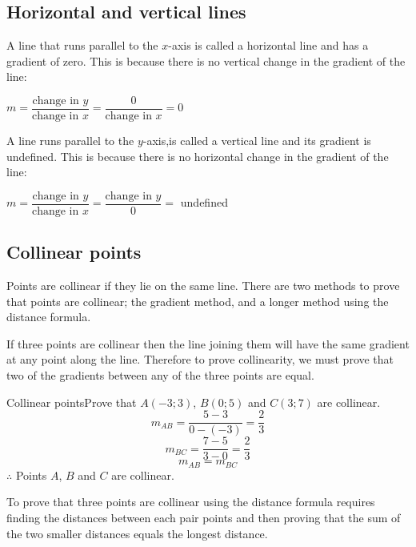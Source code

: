\subsection*{Horizontal and vertical lines}

A line that runs parallel to the $x$-axis is called a horizontal line and has a gradient of zero. This is
because there is no vertical change in the gradient of the line:\par
$m = \dfrac{\mbox{change in }y}{\mbox{change in }x} = \dfrac{0}{\mbox{change in }x} =0$\par

A line runs parallel to the $y$-axis,is called a vertical line and its gradient is undefined. This is because there is no horizontal change in the gradient of the line:\par
$m = \dfrac{\mbox{change in }y}{\mbox{change in }x} = \dfrac{\mbox{change in }y}{0}=$ undefined\par

\subsection*{Collinear points}

Points are collinear if they lie on the same line. There are two methods to prove that points are collinear; the gradient method, and a
longer method using the distance formula.

If three points are collinear then the line joining them will have the same gradient at any point along the line.
Therefore to prove collinearity, we must prove that two of the gradients between any of the three points are
equal.

\begin{wex}{Collinear points}{Prove that $A(-3;3)$, $B(0;5)$ and $C(3;7)$ are collinear.}{
\begin{equation*}
m_{AB} = \frac{5-3}{0-(-3)} = \frac{2}{3}
\end{equation*}
\begin{equation*}
m_{BC} = \frac{7-5}{3-0} = \frac{2}{3}
\end{equation*}
\begin{equation*}
m_{AB} = m_{BC}
\end{equation*}
$\therefore$ Points $A$, $B$ and $C$ are collinear.
}
\end{wex}

To prove that three points are collinear using the distance formula requires finding the
distances between each pair points and then proving that the sum of the two smaller distances
equals the longest distance.

